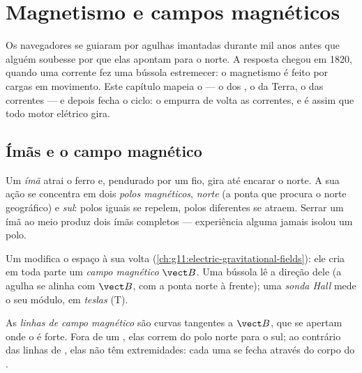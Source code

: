 \chapter{Magnetismo e campos magnéticos}\label{ch:g11:magnetic-fields}

Os navegadores se guiaram por agulhas imantadas durante mil anos antes
que alguém soubesse por que elas apontam para o norte. A resposta chegou
em 1820, quando uma corrente fez uma bússola estremecer: o magnetismo é
feito por cargas em movimento. Este capítulo mapeia o  ---
o dos , o da Terra, o das correntes --- e depois fecha o ciclo: o
 empurra de volta as correntes, e é assim que todo motor elétrico
gira.

\section{Ímãs e o campo magnético}

\begin{definition}\label{def:g11:magnetic-fields:magnet}
Um \emph{ímã} atrai o ferro e, pendurado por um fio, gira até
encarar o norte. A sua ação se concentra em dois \emph{polos
magnéticos}, \emph{norte} (a ponta que procura o
norte geográfico) e \emph{sul}: polos iguais se repelem, polos diferentes
se atraem. Serrar um ímã ao meio produz dois ímãs completos ---
experiência alguma jamais isolou um polo.
\end{definition}

\begin{definition}\label{def:g11:magnetic-fields:bfield}
Um  modifica o espaço à sua volta
(\cref{ch:g11:electric-gravitational-fields}): ele cria em toda parte um
\emph{campo magnético} $\vect B$. Uma bússola lê a
direção dele (a agulha se alinha com $\vect B$, com a ponta norte à
frente); uma \emph{sonda Hall} mede o seu módulo, em
\emph{teslas} (\unit{T}).
\end{definition}

\begin{definition}\label{def:g11:magnetic-fields:lines}
As \emph{linhas de campo magnético} são
curvas tangentes a $\vect B$, que se apertam onde o  é forte. Fora
de um , elas correm do polo norte para o sul; ao contrário das linhas
de , elas não têm extremidades: cada uma se fecha através
do corpo do .
\end{definition}

